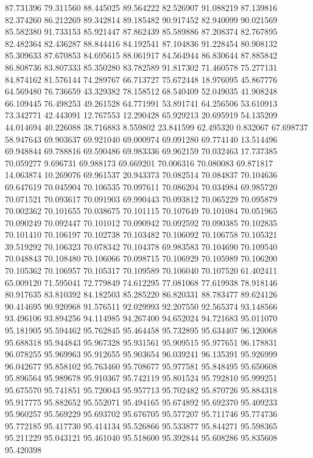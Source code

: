 87.731396
79.311560
88.445025
89.564222
82.526907
91.088219
87.139816
82.374260
86.212269
89.342814
89.185482
90.917452
82.940099
90.021569
85.582380
91.733153
85.921447
87.862439
85.589886
87.208374
82.767895
82.482364
82.436287
88.844416
84.192541
87.104836
91.228454
80.908132
85.309633
87.670853
84.695615
88.061917
84.564944
86.830644
87.885842
86.808736
83.807333
85.350280
83.782589
91.817302
71.460578
75.277131
84.874162
81.576144
74.289767
66.713727
75.672448
18.976095
45.867776
64.569480
76.736659
43.329382
78.158512
68.540409
52.049035
41.908248
66.109445
76.498253
49.261528
64.771991
53.891741
64.256506
53.610913
73.342771
42.443091
12.767553
12.290428
65.929213
20.695919
54.135209
44.014694
40.226088
38.716883
8.559802
23.841599
62.495320
0.832067
67.698737
58.947643
69.903637
69.921040
69.000974
69.091280
69.774140
13.514496
69.948844
69.788816
69.590486
69.983336
69.962159
70.032463
17.737385
70.059277
9.696731
69.988173
69.669201
70.006316
70.080083
69.871817
14.063874
10.269076
69.961537
20.943373
70.082514
70.084837
70.104636
69.647619
70.045904
70.106535
70.097611
70.086204
70.034984
69.985720
70.071521
70.093617
70.091903
69.990443
70.093812
70.065229
70.095879
70.002362
70.101655
70.038675
70.101115
70.107649
70.101084
70.051965
70.090249
70.092447
70.101012
70.090942
70.092592
70.090385
70.102835
70.101410
70.106197
70.102738
70.103482
70.106092
70.106758
70.105321
39.519292
70.106323
70.078342
70.104378
69.983583
70.104690
70.109540
70.048843
70.108480
70.106066
70.098715
70.106929
70.105989
70.106200
70.105362
70.106957
70.105317
70.109589
70.106040
70.107520
61.402411
65.009120
71.595041
72.779849
74.612295
77.081068
77.619938
78.918146
80.917635
83.810392
84.182503
85.285220
86.820331
88.783477
89.624126
90.414695
90.920968
91.576511
92.029993
92.207550
92.565374
93.148566
93.496106
93.894256
94.114985
94.267400
94.652024
94.721683
95.011070
95.181905
95.594462
95.762845
95.464458
95.732895
95.634407
96.120068
95.688318
95.944843
95.967328
95.931561
95.909515
95.977651
96.178831
96.078255
95.969963
95.912655
95.903654
96.039241
96.135391
95.926999
96.042677
95.858102
95.763460
95.708677
95.977581
95.848495
95.650608
95.896564
95.989678
95.910367
95.742119
95.801524
95.792810
95.999251
95.675570
95.741851
95.720043
95.957713
95.702482
95.870726
95.884318
95.917775
95.882652
95.552071
95.494165
95.674892
95.692370
95.409233
95.960257
95.569229
95.693702
95.676705
95.577207
95.711746
95.774736
95.772185
95.417730
95.414134
95.526866
95.533877
95.844271
95.598365
95.211229
95.043121
95.461040
95.518600
95.392844
95.608286
95.835608
95.420398
